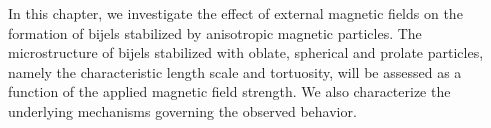 In this chapter, we investigate the effect of external magnetic fields on the formation of bijels stabilized by 
anisotropic magnetic particles. The microstructure of bijels stabilized with oblate, spherical and prolate particles, 
namely the characteristic length scale and tortuosity, will be assessed as a function of the applied magnetic field
strength. We also characterize the underlying mechanisms governing the observed behavior. 


